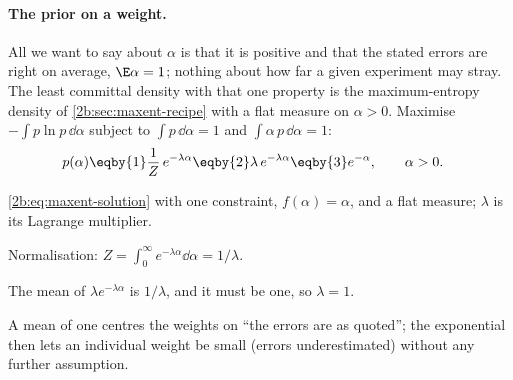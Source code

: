 \paragraph{The prior on a weight.} All we want to say about $\alpha$ is that it is positive and that the
stated errors are right on average, $\E\alpha=1$; nothing about how far a given experiment may stray. The
least committal density with that one property is the maximum-entropy density of \cref{2b:sec:maxent-recipe}
with a flat measure on $\alpha>0$. Maximise $-\int p\ln p\,\dd\alpha$ subject to $\int p\,\dd\alpha=1$ and
$\int\alpha\,p\,\dd\alpha=1$:
\begin{align}
  p(\alpha)
  &\eqby{1}\frac1Z\,e^{-\lambda\alpha}
   \eqby{2}\lambda\,e^{-\lambda\alpha}
   \eqby{3}e^{-\alpha},\qquad\alpha>0 .
  \label{9c:eq:alpha-prior}
\end{align}
\begin{explain}
  \item \eqref{2b:eq:maxent-solution} with one constraint, $f(\alpha)=\alpha$, and a flat measure; $\lambda$
        is its Lagrange multiplier.
  \item Normalisation: $Z=\int_0^\infty e^{-\lambda\alpha}\dd\alpha=1/\lambda$.
  \item The mean of $\lambda e^{-\lambda\alpha}$ is $1/\lambda$, and it must be one, so $\lambda=1$.
\end{explain}
A mean of one centres the weights on ``the errors are as quoted''; the exponential then lets an individual
weight be small (errors underestimated) without any further assumption.

